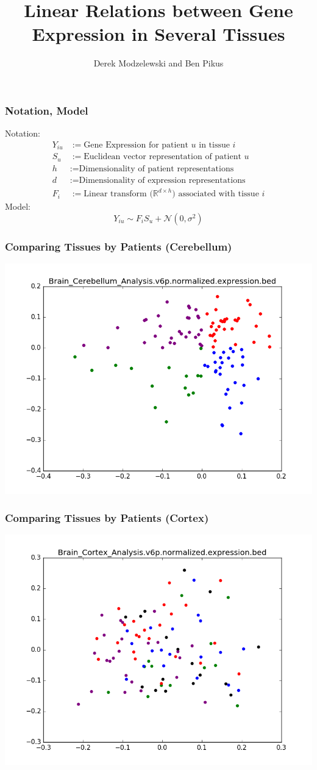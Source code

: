 \documentclass{beamer}
\title{Linear Relations between Gene Expression in Several Tissues}
\author{Derek Modzelewski and Ben Pikus}
\newcommand{\tx}[1]{\text{#1}}
\begin{document}
\frame{\titlepage}


\begin{frame}
\frametitle{Notation, Model}
Notation:
\begin{align*}
Y_{iu} &:= \tx{Gene Expression for patient $u$ in tissue $i$} \\
S_u &:= \tx{Euclidean vector representation of patient $u$} \\
h &:= \tx{Dimensionality of patient representations} \\
d &:= \tx{Dimensionality of expression representations} \\
F_i &:= \tx{Linear transform ($\mathbb{R}^{d \times h}$) associated with tissue $i$}
\end{align*}
Model:
\[ Y_{iu} \sim F_i S_u + \mathcal{N}(0, \sigma^2) \]
\end{frame}



\begin{frame} \frametitle{Comparing Tissues by Patients (Cerebellum)}
\includegraphics[scale=0.4]{Cerebellum_x_Cerebellum.png}
\end{frame}

\begin{frame} \frametitle{Comparing Tissues by Patients (Cortex)}
\includegraphics[scale=0.4]{Cerebellum_x_Cortex.png}
\end{frame}
\end{document}
